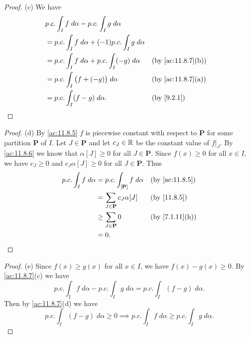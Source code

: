 \begin{proof}{(c)}
  We have
  \begin{align*}
     & p.c. \int_I f \; d \alpha - p.c. \int_I g \; d \alpha                                             \\
     & = p.c. \int_I f \; d \alpha + (-1) p.c. \int_I g \; d \alpha                                      \\
     & = p.c. \int_I f \; d \alpha + p.c. \int_I (-g) \; d \alpha   &  & \text{(by \cref{ac:11.8.7}(b))} \\
     & = p.c. \int_I \big(f + (-g)\big) \; d \alpha                 &  & \text{(by \cref{ac:11.8.7}(a))} \\
     & = p.c. \int_I (f - g) \; d \alpha.                           &  & \by{9.2.1}
  \end{align*}
\end{proof}

\begin{proof}{(d)}
  By \cref{ac:11.8.5} \(f\) is piecewise constant with respect to \(\mathbf{P}\) for some partition \(\mathbf{P}\) of \(I\).
  Let \(J \in \mathbf{P}\) and let \(c_J \in \mathbb{R}\) be the constant value of \(f|_J\).
  By \cref{ac:11.8.6} we know that \(\alpha[J] \geq 0\) for all \(J \in \mathbf{P}\).
  Since \(f(x) \geq 0\) for all \(x \in I\), we have \(c_J \geq 0\) and \(c_J \alpha[J] \geq 0\) for all \(J \in \mathbf{P}\).
  Thus
  \begin{align*}
    p.c. \int_I f \; d \alpha & = p.c. \int_{[\mathbf{P}]} f \; d \alpha &  & \text{(by \cref{ac:11.8.5})} \\
                              & = \sum_{J \in \mathbf{P}} c_J \alpha[J]  &  & \text{(by \cref{11.8.5})}    \\
                              & \geq \sum_{J \in \mathbf{P}} 0           &  & \text{(by \cref{7.1.11}(h))} \\
                              & = 0.
  \end{align*}
\end{proof}

\begin{proof}{(e)}
  Since \(f(x) \geq g(x)\) for all \(x \in I\), we have \(f(x) - g(x) \geq 0\).
  By \cref{ac:11.8.7}(c) we have
  \[
    p.c. \int_I f \; d \alpha - p.c. \int_I g \; d \alpha = p.c. \int_I (f - g) \; d \alpha.
  \]
  Then by \cref{ac:11.8.7}(d) we have
  \[
    p.c. \int_I (f - g) \; d \alpha \geq 0 \implies p.c. \int_I f \; d \alpha \geq p.c. \int_I g \; d \alpha.
  \]
\end{proof}

